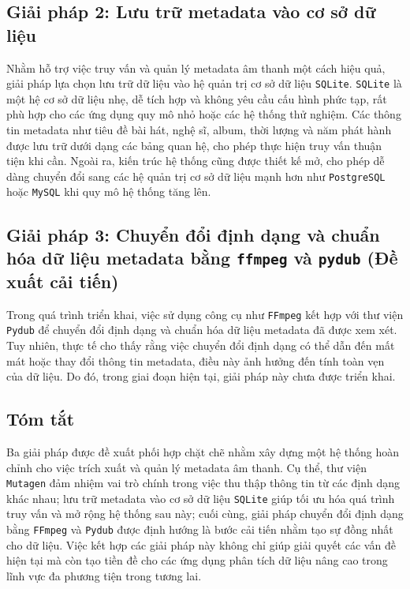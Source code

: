 \documentclass[conference]{IEEEtran}
\begin{document}
\subsection{Giải pháp 2: Lưu trữ metadata vào cơ sở dữ liệu}

Nhằm hỗ trợ việc truy vấn và quản lý metadata âm thanh một cách hiệu quả,
 giải pháp lựa chọn lưu trữ dữ liệu vào hệ quản trị cơ sở dữ liệu \texttt{SQLite}.
  \texttt{SQLite} là một hệ cơ sở dữ liệu nhẹ, dễ tích hợp và không yêu cầu cấu hình phức tạp,
   rất phù hợp cho các ứng dụng quy mô nhỏ hoặc các hệ thống thử nghiệm. Các thông tin metadata
    như tiêu đề bài hát, nghệ sĩ, album, thời lượng và năm phát hành được lưu trữ dưới dạng các bảng quan hệ,
     cho phép thực hiện truy vấn thuận tiện khi cần. Ngoài ra, kiến trúc hệ thống cũng được thiết kế mở, cho phép dễ dàng
      chuyển đổi sang các hệ quản trị cơ sở dữ liệu mạnh hơn như \texttt{PostgreSQL} hoặc \texttt{MySQL} khi quy mô hệ thống tăng lên.

\subsection{Giải pháp 3: Chuyển đổi định dạng và chuẩn hóa dữ liệu metadata bằng \texttt{ffmpeg} và \texttt{pydub} (Đề xuất cải tiến)}
Trong quá trình triển khai, việc sử dụng công cụ như \texttt{FFmpeg} kết hợp với thư viện \texttt{Pydub}
 để chuyển đổi định dạng và chuẩn hóa dữ liệu metadata đã được xem xét. Tuy nhiên, thực tế cho thấy rằng
  việc chuyển đổi định dạng có thể dẫn đến mất mát hoặc thay đổi thông tin metadata, điều này ảnh hưởng
   đến tính toàn vẹn của dữ liệu. Do đó, trong giai đoạn hiện tại, giải pháp này chưa được triển khai.
\subsection{Tóm tắt}
Ba giải pháp được đề xuất phối hợp chặt chẽ nhằm xây dựng một hệ thống hoàn chỉnh cho việc trích xuất
 và quản lý metadata âm thanh. Cụ thể, thư viện \texttt{Mutagen} đảm nhiệm vai trò chính trong việc thu thập
  thông tin từ các định dạng khác nhau; lưu trữ metadata vào cơ sở dữ liệu \texttt{SQLite} giúp tối ưu hóa quá trình 
   truy vấn và mở rộng hệ thống sau này; cuối cùng, giải pháp chuyển đổi định dạng bằng 
  \texttt{FFmpeg} và \texttt{Pydub} được định hướng là bước cải tiến nhằm tạo sự đồng nhất cho dữ liệu.
   Việc kết hợp các giải pháp này không chỉ giúp giải quyết các vấn đề hiện tại mà còn tạo tiền đề 
   cho các ứng dụng phân tích dữ liệu nâng cao trong lĩnh vực đa phương tiện
   trong tương lai.
\end{document}
